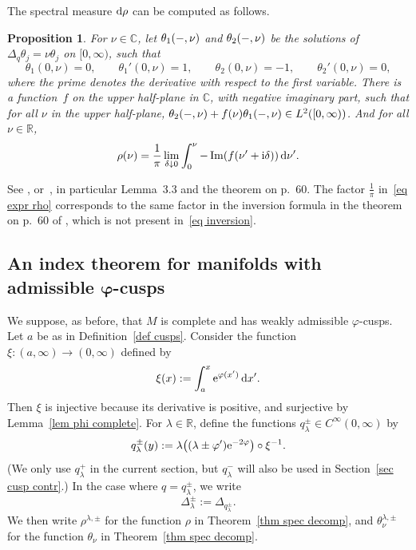 \documentclass[10pt,a4paper]{amsart}
\numberwithin{equation}{section}
\newtheorem{Proposition}[Theorem]{Proposition}
 { \theoremstyle{definition}
\newtheorem{Definition}[Theorem]{Definition}
\newtheorem{Note}[Theorem]{Note}
\newtheorem{Example}[Theorem]{Example}
\newtheorem{Remark}[Theorem]{Remark} }
\DeclareMathOperator{\Imag}{Im}
\newcommand{\R}{\mathbb{R}}
\newcommand{\C}{\mathbb{C}}
\begin{document}
The spectral measure ${\rm d}\rho$ can be computed as follows.
\begin{Proposition}\label{prop rho Titch}
For $\nu \in \C$,
let $\theta_1( \relbar, \nu)$ and $\theta_2( \relbar, \nu)$ be the solutions of $\Delta_{q}\theta_j = \nu \theta_j$ on $[0, \infty)$, such that
\[
\theta_1(0,\nu) = 0,\qquad
\theta_1'(0,\nu) = 1,\qquad
\theta_2(0,\nu) = -1,\qquad
\theta_2'(0,\nu)= 0,
\]
where the prime denotes the derivative with respect to the first variable. There is a function~$f$ on the upper half-plane in $\C$, with negative imaginary part, such that for all $\nu$ in the upper half-plane, $\theta_2(\relbar, \nu)+ f(\nu) \theta_1(\relbar, \nu) \in L^2([0,\infty))$. And for all $\nu \in \R$,
\begin{equation} \label{eq expr rho}
\rho(\nu) = \frac{1}{\pi} \lim_{\delta \downarrow 0} \int_0^{\nu} -\Imag(f(\nu'+{\rm i}\delta))\, {\rm d}\nu'.
\end{equation}
\end{Proposition}
See \cite[Theorem~2.4.1]{Levitan91}, or~\cite[Chapter~3]{Titchmarsh62}, in particular
 Lemma~3.3 and the theorem on p.~60. The factor $\frac{1}{\pi}$ in~\eqref{eq expr rho} corresponds to the same factor in the inversion formula in the theorem on p.~60 of \cite{Titchmarsh62}, which is not present in~\eqref{eq inversion}.

\subsection[An index theorem for manifolds with admissible varphi-cusps]{An index theorem for manifolds with admissible $\boldsymbol{\varphi}$-cusps}

We suppose, as before, that $M$ is complete and has weakly admissible $\varphi$-cusps. Let $a$ be as in Definition~\ref{def cusps}. Consider the function $\xi\colon (a,\infty) \to (0, \infty)$ defined by
\begin{equation} \label{eq def xi}
\xi(x) := \int_{a}^x {\rm e}^{\varphi(x')}\, {\rm d}x'.
\end{equation}
Then $\xi$ is injective because its derivative is positive, and surjective by Lemma~\ref{lem phi complete}. For $\lambda \in \R$, define the functions $q_{\lambda}^{\pm} \in C^{\infty}(0,\infty)$ by
\begin{equation} \label{eq def q lambda}
q_{\lambda}^{\pm}(y) := \lambda \bigl((\lambda \pm \varphi') {\rm e}^{-2\varphi} \bigr)\circ \xi^{-1}.
\end{equation}
(We only use $q_{\lambda}^+$
in the current section, but $q_{\lambda}^-$
will also be used in Section~\ref{sec cusp contr}.)
In the case where $q = q^{\pm}_{\lambda}$, we write
\begin{equation} \label{eq Delta lambda}
 \Delta^{\pm}_{\lambda} := \Delta_{q^{\pm}_{\lambda}}.
\end{equation}
We then write $\rho^{\lambda, \pm}$ for the function $\rho$ in Theorem~\ref{thm spec decomp}, and $\theta_{\nu}^{\lambda, \pm}$ for the function $\theta_{\nu}$ in Theorem~\ref{thm spec decomp}.
\end{document}
